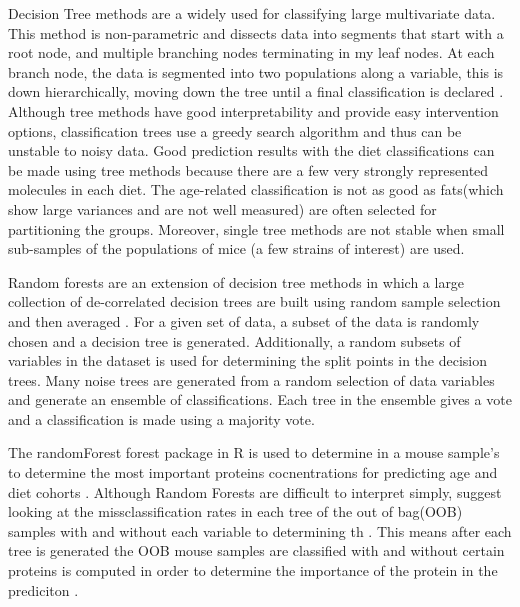 \documentclass[a4paper,11pt,twoside]{book}
\begin{document}
    Decision Tree methods are a widely used for classifying large multivariate data. This method is non-parametric and dissects data into segments that start with a root node, and multiple branching nodes terminating in my leaf nodes. At each branch node, the data is segmented into two populations along a variable, this is down hierarchically, moving down the tree until a final classification is declared \citep{Song2015DecisionTrees}. Although tree methods have good interpretability and provide easy intervention options, classification trees use a greedy search algorithm and thus can be unstable to noisy data\citep{Song2015DecisionTrees}. Good prediction results with the diet classifications can be made using tree methods because there are a few very strongly represented molecules in each diet. The age-related classification is not as good as fats(which show large variances and are not well measured) are often selected for partitioning the groups. Moreover, single tree methods are not stable when small sub-samples of the populations of mice (a few strains of interest) are used.
    
  	Random forests are an extension of decision tree methods in which a large collection of de-correlated decision trees are built using random sample selection and then averaged \citep{Hastie2009}. For a given set of data, a subset of the data is randomly chosen and a decision tree is generated. Additionally, a random subsets of variables in the dataset is used for determining the split points in the decision trees. Many noise trees are generated from a random selection of data variables and generate an ensemble of classifications. Each tree in the ensemble gives a vote and a classification is made using a majority vote\citep{Hastie2009}.  
  	
  	The randomForest forest package in R is used to determine in a mouse sample's to determine the most important proteins cocnentrations for predicting age and diet cohorts \citep{Liaw2015}. Although Random Forests are difficult to interpret simply,\citeauthor{Breiman2001} suggest looking at the missclassification rates in each tree of the out of bag(OOB) samples with and without each variable to determining th \citep{Breiman2001}. This means after each tree is generated the OOB mouse samples are classified with and without certain proteins is computed in order to determine the importance of the protein in the prediciton \citep{Hastie2009}. 
	
\end{document}
